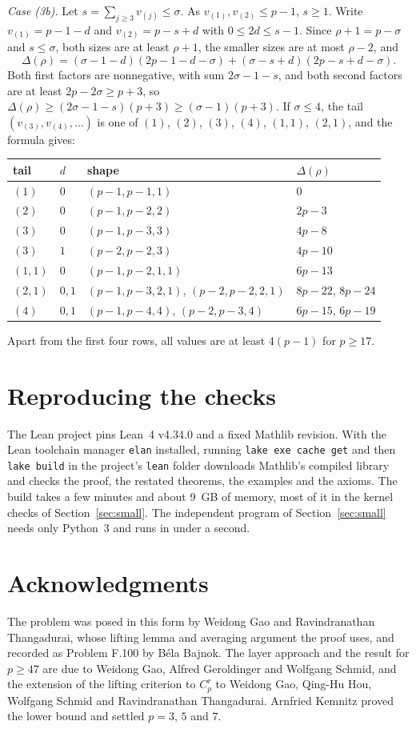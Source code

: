 \documentclass[11pt]{article}
\theoremstyle{remark}
\begin{document}
\begin{appendices}
\emph{Case (3b).} Let $s=\sum_{j\ge3}v_{(j)}\le\sigma$. As $v_{(1)},v_{(2)}\le p-1$, $s\ge1$. Write $v_{(1)}=p-1-d$ and $v_{(2)}=p-s+d$ with $0\le2d\le s-1$. Since $\rho+1=p-\sigma$ and $s\le\sigma$, both sizes are at least $\rho+1$, the smaller sizes are at most $\rho-2$, and
\[
\Delta(\rho)=(\sigma-1-d)(2p-1-d-\sigma)+(\sigma-s+d)(2p-s+d-\sigma).
\]
Both first factors are nonnegative, with sum $2\sigma-1-s$, and both second factors are at least $2p-2\sigma\ge p+3$, so $\Delta(\rho)\ge(2\sigma-1-s)(p+3)\ge(\sigma-1)(p+3)$. If $\sigma\le4$, the tail $(v_{(3)},v_{(4)},\dots)$ is one of $(1)$, $(2)$, $(3)$, $(4)$, $(1,1)$, $(2,1)$, and the formula gives:
\begin{center}
\begin{tabular}{llll}
tail & $d$ & shape & $\Delta(\rho)$\\\hline
$(1)$ & $0$ & $(p-1,p-1,1)$ & $0$\\
$(2)$ & $0$ & $(p-1,p-2,2)$ & $2p-3$\\
$(3)$ & $0$ & $(p-1,p-3,3)$ & $4p-8$\\
$(3)$ & $1$ & $(p-2,p-2,3)$ & $4p-10$\\
$(1,1)$ & $0$ & $(p-1,p-2,1,1)$ & $6p-13$\\
$(2,1)$ & $0,1$ & $(p-1,p-3,2,1)$, $(p-2,p-2,2,1)$ & $8p-22$, $8p-24$\\
$(4)$ & $0,1$ & $(p-1,p-4,4)$, $(p-2,p-3,4)$ & $6p-15$, $6p-19$
\end{tabular}
\end{center}
Apart from the first four rows, all values are at least $4(p-1)$ for $p\ge17$.

\section{Reproducing the checks}\label{app:repro}

The Lean project pins Lean~4 v4.34.0 and a fixed Mathlib revision. With the Lean toolchain manager \texttt{elan} installed, running \texttt{lake exe cache get} and then \texttt{lake build} in the project's \texttt{lean} folder downloads Mathlib's compiled library and checks the proof, the restated theorems, the examples and the axioms. The build takes a few minutes and about 9~GB of memory, most of it in the kernel checks of Section~\ref{sec:small}. The independent program of Section~\ref{sec:small} needs only Python~3 and runs in under a second.
\end{appendices}

\section*{Acknowledgments}
The problem was posed in this form by Weidong Gao and Ravindranathan Thangadurai, whose lifting lemma and averaging argument the proof uses, and recorded as Problem F.100 by Béla Bajnok. The layer approach and the result for $p\ge47$ are due to Weidong Gao, Alfred Geroldinger and Wolfgang Schmid, and the extension of the lifting criterion to $C_p^r$ to Weidong Gao, Qing-Hu Hou, Wolfgang Schmid and Ravindranathan Thangadurai. Arnfried Kemnitz proved the lower bound and settled $p=3$, $5$ and $7$.
\end{document}
